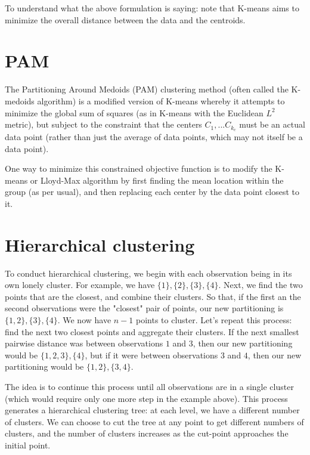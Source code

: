 To understand what the above formulation is saying: note that K-means aims to minimize the overall distance between the data and the centroids.





\section{PAM}

The Partitioning Around Medoids (PAM) clustering method (often called the K-medoids algorithm) is a modified version of K-means whereby it attempts to minimize the global sum of squares (as in K-means with the Euclidean $L^2$ metric), but subject to the constraint that the centers $C_1, ... C_{k_c}$ must be an actual data point (rather than just the average of data points, which may not itself be a data point). 

One way to minimize this constrained objective function is to modify the K-means or Lloyd-Max algorithm by first finding the mean location within the group (as per usual), and then replacing each center by the data point closest to it. 


\section{Hierarchical clustering}

To conduct hierarchical clustering, we begin with each observation being in its own lonely cluster. For example, we have $\{1\}, \{2\}, \{3\}, \{4\}$. Next, we find the two points that are the closest, and combine their clusters. So that, if the first an the second observations were the "closest" pair of points, our new partitioning is $\{1, 2\}, \{3\}, \{4\}$. We now have $n-1$ points to cluster. Let's repeat this process: find the next two closest points and aggregate their clusters. If the next smallest pairwise distance was between observations $1$ and $3$, then our new partitioning would be $\{1, 2, 3\}, \{4\}$, but if it were between observations $3$ and $4$, then our new partitioning would be $\{1, 2\}, \{3, 4\}$.

The idea is to continue this process until all observations are in a single cluster (which would require only one more step in the example above). This process generates a hierarchical clustering tree: at each level, we have a different number of clusters. We can choose to cut the tree at any point to get different numbers of clusters, and the number of clusters increases as the cut-point approaches the initial point.

